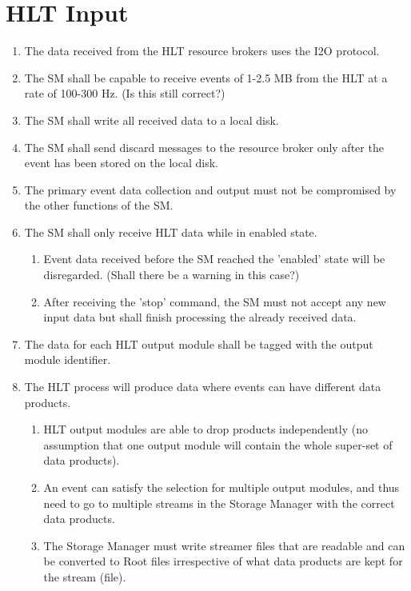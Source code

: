 \documentclass[]{article}
\begin{document}
\section{HLT Input}

\begin{enumerate}

\item The data received from the HLT resource brokers uses the I2O protocol.

\item The SM shall be capable to receive events of 1-2.5 MB from the HLT at a rate of 100-300 Hz. (Is this still correct?)

\item The SM shall write all received data to a local disk.

\item The SM shall send discard messages to the resource broker only after the event has been stored on the local disk.

\item The primary event data collection and output must not be compromised by the other functions of the SM.

\item The SM shall only receive HLT data while in enabled state.
\begin{enumerate}
\item Event data received before the SM reached the 'enabled' state will be disregarded. (Shall there be a warning in this case?)
\item After receiving the 'stop' command, the SM must not accept any new input data but shall finish processing the already received data.
\end{enumerate}

\item The data for each HLT output module shall be tagged with the output module identifier.

\item The HLT process will produce data where events can have different data products.

\begin{enumerate}
\item HLT output modules are able to drop products independently (no assumption that one output module will contain the whole super-set of data products).

\item An event can satisfy the selection for multiple output modules, and thus need to go to 
multiple streams in the Storage Manager with the correct data products.

\item  The Storage Manager must write streamer files that are readable and can be converted to 
Root files irrespective of what data products are kept for the stream (file). 

\end{enumerate}

\end{enumerate}
\end{document}
